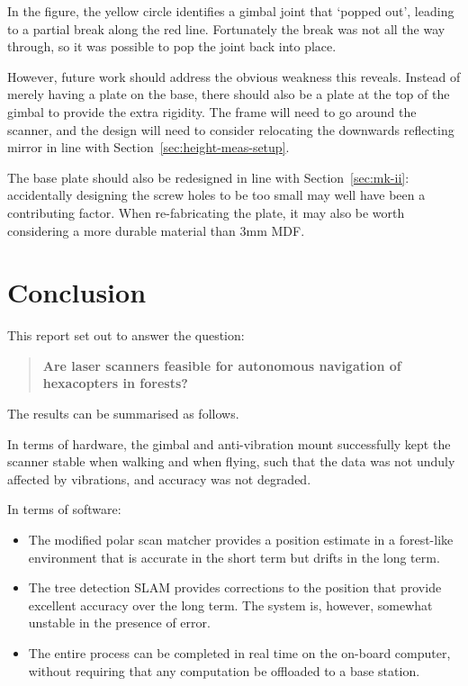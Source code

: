 \documentclass[12pt,oneside,a4paper]{book}
\begin{document}
In the figure, the yellow circle identifies a gimbal joint that
`popped out', leading to a partial break along the red
line. Fortunately the break was not all the way through, so it was
possible to pop the joint back into place.

However, future work should address the obvious weakness this
reveals. Instead of merely having a plate on the base, there should
also be a plate at the top of the gimbal to provide the extra
rigidity. The frame will need to go around the scanner, and the design
will need to consider relocating the downwards reflecting mirror in
line with Section~\ref{sec:height-meas-setup}.

The base plate should also be redesigned in line with
Section~\ref{sec:mk-ii}: accidentally designing the screw holes to be
too small may well have been a contributing factor. When re-fabricating
the plate, it may also be worth considering a more durable material
than 3mm MDF.

\chapter{Conclusion}
\label{cha:conclusion}


This report set out to answer the question: 
\begin{quote}
  \textbf{Are laser scanners feasible for autonomous navigation of
    hexacopters in forests?}
\end{quote}

The results can be summarised as follows.

In terms of hardware, the gimbal and anti-vibration mount successfully
kept the scanner stable when walking and when flying, such that the
data was not unduly affected by vibrations, and accuracy was not
degraded.

In terms of software:
\begin{itemize}
\item The modified polar scan matcher provides a position estimate in
  a forest-like environment that is accurate in the short term but
  drifts in the long term.
\item The tree detection SLAM provides corrections to the position
  that provide excellent accuracy over the long term. The system is,
  however, somewhat unstable in the presence of error.
\item The entire process can be completed in real time on the on-board
  computer, without requiring that any computation be offloaded to a
  base station.
\end{itemize}
\end{document}
